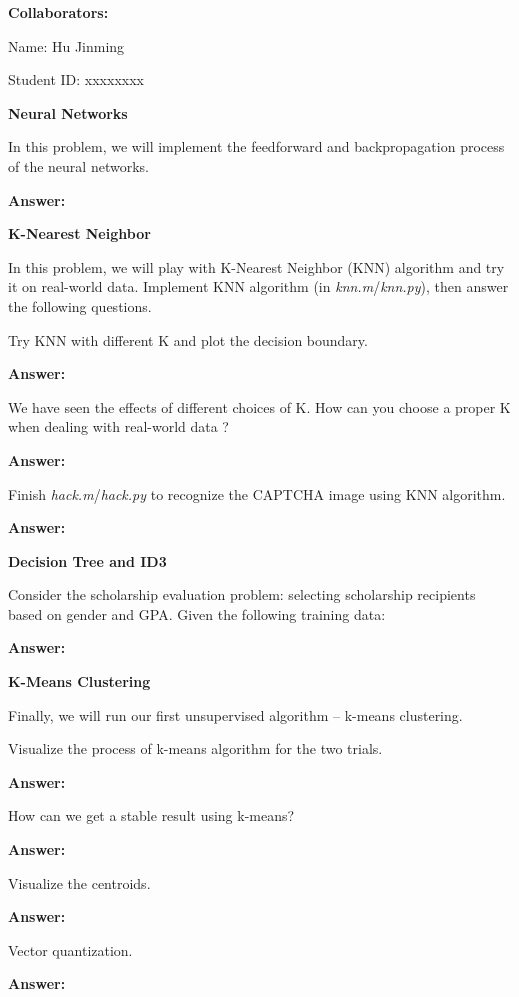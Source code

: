 \documentclass[12pt,twoside]{article}
\newcommand{\answer}{
 \par\medskip
 \textbf{Answer:}
}
\newcommand{\collaborators}{ \textbf{Collaborators:}

\tabT Name: Hu Jinming

\tabT Student ID: xxxxxxxx
}
\newcommand{\answerIa}{ \answer

}
\newcommand{\answerIIa}{ \answer

}
\newcommand{\answerIIb}{ \answer

}
\newcommand{\answerIIc}{ \answer

}
\newcommand{\answerIIIa}{ \answer 


}
\newcommand{\answerIIIIa}{ \answer
	

}
\newcommand{\answerIIIIb}{ \answer
	
	
}
\newcommand{\answerIIIIc}{ \answer

}
\newcommand{\answerIIIId}{ \answer
	
}
\newcommand{\theproblemsetnum}{3}
\newcommand{\releasedate}{May 27, 2019}
\newcommand{\partaduedate}{Thursday, June 13}
\newcommand{\tabUnit}{3ex}
\newcommand{\tabT}{\hspace*{\tabUnit}}
\begin{document}
\handout{Homework \theproblemsetnum}{\releasedate}

%
\collaborators

\medskip

\hrulefill

\begin{problems}

\problem \textbf{Neural Networks}

In this problem, we will implement the feedforward and backpropagation process of
the neural networks.
\begin{problemparts}
\problempart 
\answerIa

\end{problemparts}

\problem \textbf{K-Nearest Neighbor}

In this problem, we will play with K-Nearest Neighbor (KNN) algorithm and try it on
real-world data. Implement KNN algorithm (in \emph{knn.m}/\emph{knn.py}), then answer the following questions.
\begin{problemparts}
\problempart
Try KNN with different K and plot the decision boundary.


\answerIIa

\problempart We have seen the effects of different choices of K. How can you choose a proper K
when dealing with real-world data ?

\answerIIb

\problempart Finish \emph{hack.m}/\emph{hack.py} to recognize the CAPTCHA image using KNN algorithm.

\answerIIc
\end{problemparts}

\problem \textbf{Decision Tree and ID3}

Consider the scholarship evaluation problem: selecting scholarship recipients based on gender
and GPA. Given the following training data:

\answerIIIa


\problem \textbf{K-Means Clustering}

Finally, we will run our first unsupervised algorithm – k-means clustering.
\begin{problemparts}
	\problempart
	Visualize the process of k-means algorithm for the two trials.
	
	\answerIIIIa
	
	\problempart How can we get a stable result using k-means?
	
	\answerIIIIb
	
	\problempart  Visualize the centroids.
	
	\answerIIIIc
	
	\problempart  Vector quantization.
	
	\answerIIIId
	
\end{problemparts}


\end{problems}
\end{document}
